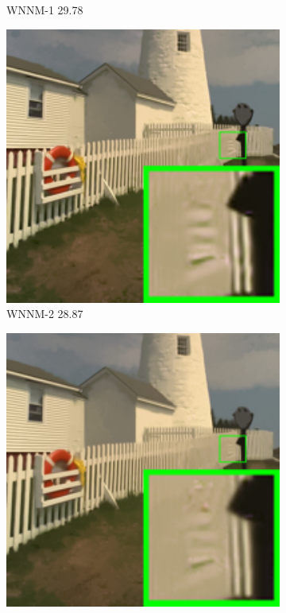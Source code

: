 \begin{figure}
\begin{subfigure}[t]{0.19\textwidth}
		\caption{WNNM-1 29.78}
    \end{subfigure}
    \hfill
    \begin{subfigure}[t]{0.19\textwidth}
        \centering
        \includegraphics[width=1\textwidth]{images/mcwnnm/24images/resize_br_WNNMJ_nSig301050_kodim19.png}
		\caption{WNNM-2 28.87}
    \end{subfigure}
    \hfill
    \begin{subfigure}[t]{0.19\textwidth}
        \centering
        \includegraphics[width=1\textwidth]{images/mcwnnm/24images/resize_br_WNNM_ADMM_nSig301050_kodim19.png}

\end{subfigure}
\end{figure}
